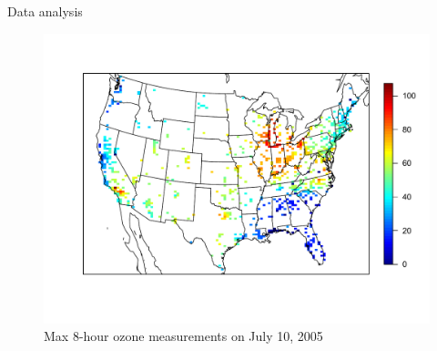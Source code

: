 \documentclass{beamer}
\begin{document}
\begin{frame}{Data analysis}
  \centering
  \begin{figure}
    \includegraphics[width=\linewidth, trim=0 1in 0 0.7in ]{./plots/pot/ozone-10jul-us.pdf}
    \caption{Max 8-hour ozone measurements on July 10, 2005}
   \end{figure}
\end{frame}

\end{document}
